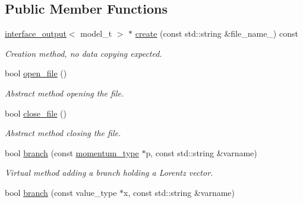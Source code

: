 \subsection*{Public Member Functions}
\begin{DoxyCompactItemize}
\item 
\hypertarget{a00017_af57ec7a3a2bda096ef2d53f51e05bb65}{}\hyperlink{a00319}{interface\+\_\+output}$<$ model\+\_\+t $>$ $\ast$ \hyperlink{a00017_af57ec7a3a2bda096ef2d53f51e05bb65}{create} (const std\+::string \&file\+\_\+name\+\_\+) const \label{a00017_af57ec7a3a2bda096ef2d53f51e05bb65}

\begin{DoxyCompactList}\small\item\em Creation method, no data copying expected. \end{DoxyCompactList}\item 
\hypertarget{a00017_aa2e585f2d6fcecdb532fa4465474a4a0}{}bool \hyperlink{a00017_aa2e585f2d6fcecdb532fa4465474a4a0}{open\+\_\+file} ()\label{a00017_aa2e585f2d6fcecdb532fa4465474a4a0}

\begin{DoxyCompactList}\small\item\em Abstract method opening the file. \end{DoxyCompactList}\item 
\hypertarget{a00017_abf39e5b9a7ca84fda5756c8e9b61ce2f}{}bool \hyperlink{a00017_abf39e5b9a7ca84fda5756c8e9b61ce2f}{close\+\_\+file} ()\label{a00017_abf39e5b9a7ca84fda5756c8e9b61ce2f}

\begin{DoxyCompactList}\small\item\em Abstract method closing the file. \end{DoxyCompactList}\item 
\hypertarget{a00017_a2267177d35239d603fcfb31fbd1a24d9}{}bool \hyperlink{a00017_a2267177d35239d603fcfb31fbd1a24d9}{branch} (const \hyperlink{a00579}{momentum\+\_\+type} $\ast$p, const std\+::string \&varname)\label{a00017_a2267177d35239d603fcfb31fbd1a24d9}

\begin{DoxyCompactList}\small\item\em Virtual method adding a branch holding a Lorentz vector. \end{DoxyCompactList}\item 
\hypertarget{a00017_a5ab7a2bbc80638b1f507329af52b6c6c}{}bool \hyperlink{a00017_a5ab7a2bbc80638b1f507329af52b6c6c}{branch} (const value\+\_\+type $\ast$x, const std\+::string \&varname)\label{a00017_a5ab7a2bbc80638b1f507329af52b6c6c}


\end{DoxyCompactItemize}
